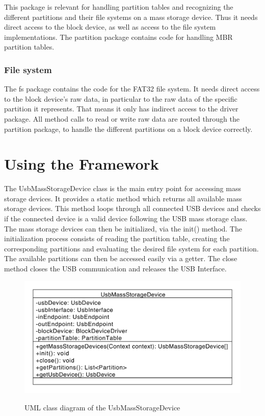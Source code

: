 This package is relevant for handling partition tables and recognizing the different partitions and their file systems on a mass storage device. Thus it needs direct access to the block device, as well as access to the file system implementations. The partition package contains code for handling MBR partition tables.

\subsubsection{File system}

The fs package contains the code for the FAT32 file system. It needs direct access to the block device's raw data, in particular to the raw data of the specific partition it represents. That means it only has indirect access to the driver package. All method calls to read or write raw data are routed through the partition package, to handle the different partitions on a block device correctly.

\section{Using the Framework}

The UsbMassStorageDevice class is the main entry point for accessing mass storage devices. It provides a static method which returns all available mass storage devices. This method loops through all connected USB devices and checks if the connected device is a valid device following the USB mass storage class. The mass storage devices can then be initialized, via the init() method. The initialization process consists of reading the partition table, creating the corresponding partitions and evaluating the desired file system for each partition.  The available partitions can then be accessed easily via a getter. The close method closes the USB communication and releases the USB Interface.

\begin{figure}[h!]
\caption{UML class diagram of the UsbMassStorageDevice}
\centering
\includegraphics[scale=0.85]{figures/usb_mass_dev}
\label{figure:mass_dev}
\end{figure}


